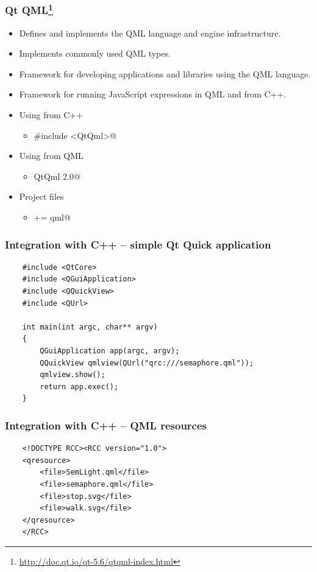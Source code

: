  \begin{frame}[fragile]
  \frametitle{Qt QML\footnote{\url{http://doc.qt.io/qt-5.6/qtqml-index.html}}}
  \small
  \begin{itemize}
    \item Defines and implements the QML language and engine infrastructure.
    \item Implements commonly used QML types.
    \item Framework for developing applications and libraries using the QML
      language. 
    \item Framework for running JavaScript expressions in QML and from C++.
    \item Using from C++
    \begin{itemize}
      \item \verb@#include <QtQml>@
    \end{itemize}
    \item Using from QML
    \begin{itemize}
      \item \verb@import QtQml 2.0@
    \end{itemize}
    \item Project files
    \begin{itemize}
      \item \verb@QT += qml@
    \end{itemize}
  \end{itemize}
\end{frame}

 \begin{frame}[fragile]
  \frametitle{Integration with C++ -- simple Qt Quick application}
  \begin{lstlisting}
	#include <QtCore>
	#include <QGuiApplication>
	#include <QQuickView>
	#include <QUrl>

	int main(int argc, char** argv)
	{
	    QGuiApplication app(argc, argv);
	    QQuickView qmlview(QUrl("qrc:///semaphore.qml"));
	    qmlview.show();
	    return app.exec();
	}
  \end{lstlisting}
\end{frame}

 \begin{frame}[fragile]
  \frametitle{Integration with C++ -- QML resources}
  \begin{lstlisting}
	<!DOCTYPE RCC><RCC version="1.0">
	<qresource>
	    <file>SemLight.qml</file>
	    <file>semaphore.qml</file>
	    <file>stop.svg</file>
	    <file>walk.svg</file>
	</qresource>
	</RCC>
  \end{lstlisting}
\end{frame}


